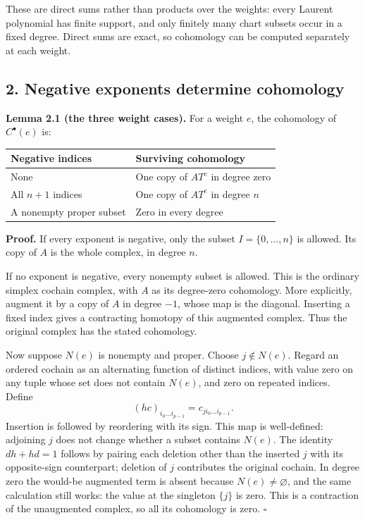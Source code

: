 \documentclass[11pt]{article}
\begin{document}
These are direct sums rather than products over the weights: every
Laurent polynomial has finite support, and only finitely many chart
subsets occur in a fixed degree. Direct sums are exact, so cohomology
can be computed separately at each weight.

\subsection{2. Negative exponents determine
cohomology}\label{negative-exponents-determine-cohomology}

\textbf{Lemma 2.1 (the three weight cases).} For a weight \(e\), the
cohomology of \(C^\bullet(e)\) is:

{
\begin{longtable}[]{@{}ll@{}}
\toprule\noalign{}
Negative indices & Surviving cohomology \\
\midrule\noalign{}
\endhead
\bottomrule\noalign{}
\endlastfoot
None & One copy of \(A T^e\) in degree zero \\
All \(n+1\) indices & One copy of \(A T^e\) in degree \(n\) \\
A nonempty proper subset & Zero in every degree \\
\end{longtable}
}

\textbf{Proof.} If every exponent is negative, only the subset
\(I=\{0,\ldots,n\}\) is allowed. Its copy of \(A\) is the whole complex,
in degree \(n\).

If no exponent is negative, every nonempty subset is allowed. This is
the ordinary simplex cochain complex, with \(A\) as its degree-zero
cohomology. More explicitly, augment it by a copy of \(A\) in degree
\(-1\), whose map is the diagonal. Inserting a fixed index gives a
contracting homotopy of this augmented complex. Thus the original
complex has the stated cohomology.

Now suppose \(N(e)\) is nonempty and proper. Choose \(j\notin N(e)\).
Regard an ordered cochain as an alternating function of distinct
indices, with value zero on any tuple whose set does not contain
\(N(e)\), and zero on repeated indices. Define \[
(hc)_{i_0\ldots i_{p-1}}=c_{j i_0\ldots i_{p-1}}.
\] Insertion is followed by reordering with its sign. This map is
well-defined: adjoining \(j\) does not change whether a subset contains
\(N(e)\). The identity \(dh+hd=1\) follows by pairing each deletion
other than the inserted \(j\) with its opposite-sign counterpart;
deletion of \(j\) contributes the original cochain. In degree zero the
would-be augmented term is absent because \(N(e)\ne\varnothing\), and
the same calculation still works: the value at the singleton \(\{j\}\)
is zero. This is a contraction of the unaugmented complex, so all its
cohomology is zero. \(\square\)
\end{document}
